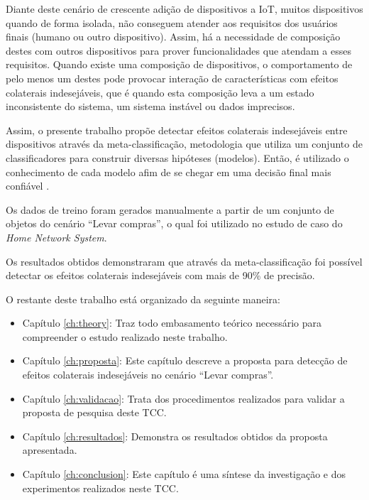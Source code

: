 Diante deste cenário de crescente adição de dispositivos a IoT, muitos dispositivos quando de forma isolada, não conseguem atender aos requisitos dos usuários finais (humano ou outro dispositivo). Assim, há a necessidade de composição destes com outros dispositivos para prover funcionalidades que atendam a esses requisitos. Quando existe uma composição de dispositivos, o comportamento de pelo menos um destes pode provocar interação de características com efeitos colaterais indesejáveis, que é quando esta composição leva a um estado inconsistente do sistema, um sistema instável ou dados imprecisos. 

Assim, o presente trabalho propõe detectar efeitos colaterais indesejáveis entre dispositivos através da meta-classificação, metodologia que utiliza um conjunto de classificadores para construir diversas hipóteses (modelos). Então, é utilizado o conhecimento de cada modelo afim de se chegar em uma decisão final mais confiável \cite{Melville:2004}.

Os dados de treino foram gerados manualmente a partir de um conjunto de objetos do cenário ``Levar compras'', o qual foi utilizado no estudo de caso do \textit{Home Network System}.

Os resultados obtidos demonstraram que através da meta-classificação foi possível detectar os efeitos colaterais indesejáveis com mais de 90\% de precisão.

O restante deste trabalho está organizado da seguinte maneira:

\begin{itemize}
\item Capítulo \ref{ch:theory}: Traz todo embasamento teórico necessário para compreender o estudo realizado neste trabalho.
\item Capítulo \ref{ch:proposta}: Este capítulo descreve a proposta para detecção de efeitos colaterais indesejáveis no cenário ``Levar compras''.
\item Capítulo \ref{ch:validacao}: Trata dos procedimentos realizados para validar a proposta de pesquisa deste TCC.
\item Capítulo \ref{ch:resultados}: Demonstra os resultados obtidos da proposta apresentada.
\item Capítulo \ref{ch:conclusion}: Este capítulo é uma síntese da investigação e dos experimentos realizados neste TCC.
\end{itemize}
